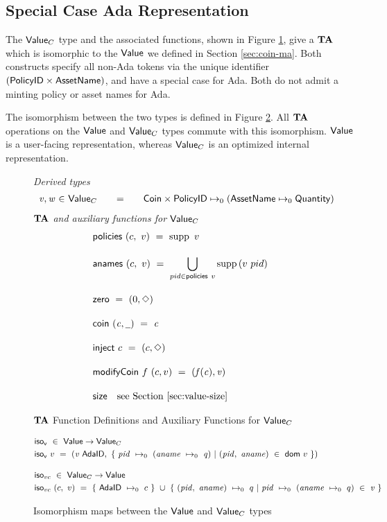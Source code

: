 \subsection{Special Case Ada Representation}
\label{sec:coin-value}

The $\mathsf{Value}_C$ type and the associated functions, shown in Figure \ref{fig:special-ada},
give a $\mathbf{TA}$ which is isomorphic to the $\mathsf{Value}$ we defined in
Section \ref{sec:coin-ma}. Both constructs
specify all non-Ada tokens via the unique identifier $(\mathsf{PolicyID} \times \mathsf{AssetName})$, and
have a special case for Ada. Both do not admit a minting policy or asset names for Ada.

The isomorphism between the two types is defined in Figure \ref{fig:iso-v}.
All $\mathbf{TA}$ operations on the $\mathsf{Value}$ and $\mathsf{Value}_C$ types commute with this
isomorphism. $\mathsf{Value}$ is a user-facing representation, whereas $\mathsf{Value}_C$
is an optimized internal representation.

\begin{figure*}[t!]
  \emph{Derived types}
  \begin{equation*}
    \begin{array}{r@{~\in~}l@{\qquad=\qquad}lr}
      \var{v}, \var{w} & \Value_C
      & \Coin \times \PolicyID \mapsto_0 ( \AssetName \mapsto_0 \Quantity )
    \end{array}
  \end{equation*}
  \emph{$\mathbf{TA}$ and auxiliary functions for $\mathsf{Value}_C$}
  \begin{align*}
    & \fun{policies}~(c,~v) ~=~ \supp{~v}
    \nextdef
    & \fun{anames}~(c, ~v) ~=~ \bigcup_{pid \in\fun{policies}{~v}} \supp{(v~pid)}
    \nextdef
    & \fun{zero} ~=~ (0, \Nothing)
    \nextdef
    & \fun{coin}~(\var{c}, \wcard) ~=~ \var{c}
    \nextdef
    & \fun{inject}~c  ~=~ (c, \Nothing)
    \nextdef
    & \fun{modifyCoin}~f~(c, v)  ~=~ \var{(f(c), v)}
    \nextdef
    & \fun{size} ~~~ \text{see Section \ref{sec:value-size}}
  \end{align*}
  \caption{$\mathbf{TA}$ Function Definitions and Auxiliary Functions for $\mathsf{Value}_C$}
  \label{fig:special-ada}
\end{figure*}

\begin{figure*}[t!]
  \begin{align*}
    & \fun{iso_v} ~\in~ \Value \to \Value_C \\
    & \fun{iso_v}~v ~=~(\var{v}~\mathsf{AdaID},~\{~\var{pid}~\mapsto_0~(\var{aname}~\mapsto_0~\var{q})~
    \vert~(\var{pid},~\var{aname})~\in~\fun{dom}~{v}~\})
    \nextdef
    & \fun{iso}_{vc} ~\in~ \Value_C \to \Value \\
    & \fun{iso}_{vc}~(c, ~v) ~=~ \{~\mathsf{AdaID}~\mapsto_0~c~\}~\cup~
     \{~(\var{pid},~\var{aname})~\mapsto_0~q~\vert~\var{pid}~\mapsto_0~(\var{aname}~\mapsto_0~q)~ \in~\var{v}~\}
  \end{align*}
  \caption{Isomorphism maps between the $\mathsf{Value}$ and $\mathsf{Value}_C$ types}
  \label{fig:iso-v}
\end{figure*}

